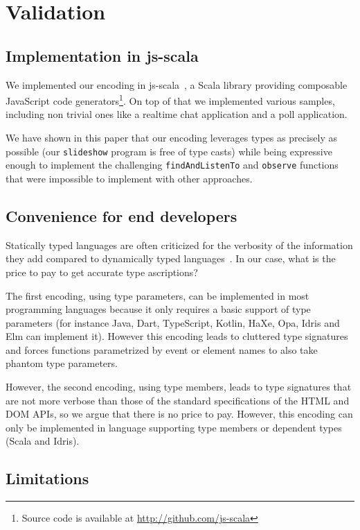 \documentclass{llncs}
\newcommand{\jscode}[1]{\lstinline[language=JavaScript]|#1|}
\newcommand{\scalacode}[1]{\lstinline[language=Scala]|#1|}
\begin{document}
\section{Validation}
\label{sec-validation}

\subsection{Implementation in js-scala}

We implemented our encoding in js-scala~\cite{Kossakowski12_JsDESL}, a Scala library providing composable JavaScript code generators\footnote{Source code is available at \href{http://github.com/js-scala}{http://github.com/js-scala}}. On top of that we implemented various samples, including non trivial ones like a realtime chat application and a poll application.

We have shown in this paper that our encoding leverages types as precisely as possible (our \scalacode{slideshow} program is free of type casts) while being expressive enough to implement the challenging \jscode{findAndListenTo} and \jscode{observe} functions that were impossible to implement with other approaches.

\subsection{Convenience for end developers}

Statically typed languages are often criticized for the verbosity of the information they add compared to dynamically typed languages~\cite{meijer2004static}. In our case, what is the price to pay to get accurate type ascriptions?

The first encoding, using type parameters, can be implemented in most programming languages because it only requires a basic support of type parameters (for instance Java, Dart, TypeScript, Kotlin, HaXe, Opa, Idris and Elm can implement it). However this encoding leads to cluttered type signatures and forces functions parametrized by event or element names to also take phantom type parameters.

However, the second encoding, using type members, leads to type signatures that are not more verbose than those of the standard specifications of the HTML and DOM APIs, so we argue that there is no price to pay. However, this encoding can only be implemented in language supporting type members or dependent types (Scala and Idris).

\subsection{Limitations}
\end{document}
